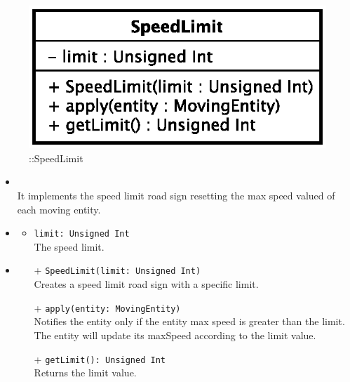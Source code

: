 \begin{figure}[h]
\centering
\includegraphics[scale=0.6,keepaspectratio]{images/solution/speed_limit.eps}
\caption{\pPassive::SpeedLimit}
\label{fig:sd-app-speed_limit}
\end{figure}
\FloatBarrier
\begin{itemize}
  \item \textbf{\descr} \\
It implements the speed limit road sign resetting the max speed valued of each moving entity.
  \item \textbf{\attrs}
  \begin{itemize}
    \item \texttt{limit: Unsigned Int} \\
The speed limit.
  \end{itemize}
  \item \textbf{\ops}
  \begin{itemize} 
  \item[+] \texttt{SpeedLimit(limit: Unsigned Int)} \\
Creates a speed limit road sign with a specific limit.    
  \item[+] \texttt{apply(entity: MovingEntity)} \\
Notifies the entity only if the entity max speed is greater than the limit.
The entity will update its maxSpeed according to the limit value.
  \item[+] \texttt{getLimit(): Unsigned Int} \\
Returns the limit value.
  \end{itemize}
\end{itemize}
